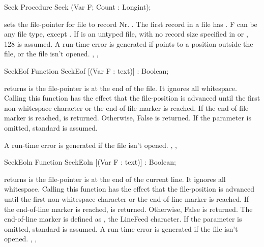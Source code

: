 \documentclass{report}
\begin{document}

\begin{procedure}{Seek}
\Declaration
Procedure Seek (Var F; Count : Longint);

\Description
{} sets the file-pointer for file  to record Nr. .
The first record in a file has . F can be any file type, except
. If  is an untyped file, with no record size specified in
 or , 128 is assumed.
\Errors
A run-time error is generated if  points to a position outside
the file, or the file isn't opened.
\SeeAlso
{}, , 
\end{procedure}


\begin{function}{SeekEof}
\Declaration
Function SeekEof [(Var F : text)] : Boolean;

\Description
{} returns  is the file-pointer is at the end of the
file. It ignores all whitespace.
Calling this function has the effect that the file-position is advanced
until the first non-whitespace character or the end-of-file marker is
reached.
If the end-of-file marker is reached,  is returned. Otherwise,
False is returned.
If the parameter  is omitted, standard  is assumed.

\Errors
A run-time error is generated if the file  isn't opened.
\SeeAlso
{}, , 
\end{function}


\begin{function}{SeekEoln}
\Declaration
Function SeekEoln [(Var F : text)] : Boolean;

\Description
{} returns  is the file-pointer is at the end of the
current line. It ignores all whitespace.
Calling this function has the effect that the file-position is advanced
until the first non-whitespace character or the end-of-line marker is
reached.
If the end-of-line marker is reached,  is returned. Otherwise,
False is returned.
The end-of-line marker is defined as , the LineFeed character.
If the parameter  is omitted, standard  is assumed.
\Errors
A run-time error is generated if the file  isn't opened.
\SeeAlso
{}, , 
\end{function}
\end{document}
